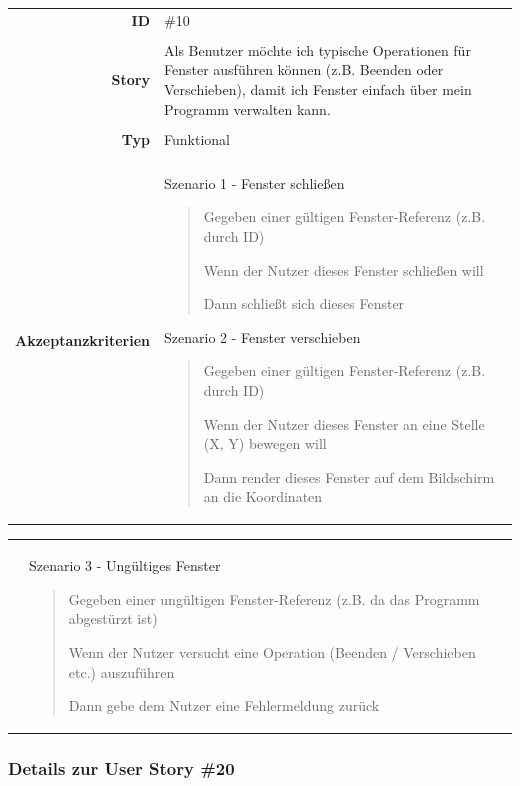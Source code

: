 \documentclass{article}
\begin{document}
\begin{tabularx}{\textwidth}{r X}
	\textbf{ID}                 & \#10                                                                                                                                                                    \\
	\\
	\textbf{Story}              & Als Benutzer möchte ich typische Operationen für Fenster ausführen können (z.B. Beenden oder Verschieben), damit ich Fenster einfach über mein Programm verwalten kann. \\
	\\
	\textbf{Typ}                & Funktional                                                                                                                                                              \\
	\\
	\textbf{Akzeptanzkriterien} & Szenario 1 - Fenster schließen
	\begin{quote}
		Gegeben einer gültigen Fenster-Referenz (z.B. durch ID)

		Wenn der Nutzer dieses Fenster schließen will

		Dann schließt sich dieses Fenster
	\end{quote}
	Szenario 2 - Fenster verschieben
	\begin{quote}
		Gegeben einer gültigen Fenster-Referenz (z.B. durch ID)

		Wenn der Nutzer dieses Fenster an eine Stelle (X, Y) bewegen will

		Dann render dieses Fenster auf dem Bildschirm an die Koordinaten
	\end{quote}
\end{tabularx}

\begin{tabularx}{\textwidth}{r X}
	\hspace*{7.75em} & Szenario 3 - Ungültiges Fenster
	\begin{quote}
		Gegeben einer ungültigen Fenster-Referenz (z.B. da das Programm abgestürzt ist)

		Wenn der Nutzer versucht eine Operation (Beenden / Verschieben etc.) auszuführen

		Dann gebe dem Nutzer eine Fehlermeldung zurück
	\end{quote}
\end{tabularx}

\subsubsection{Details zur User Story \#20}
\end{document}
